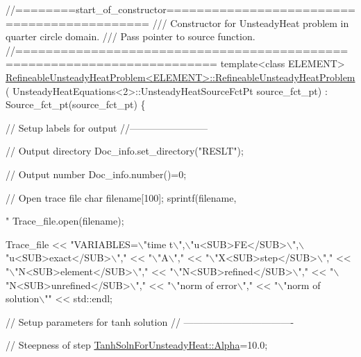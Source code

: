 \begin{DoxyCodeInclude}
\textcolor{comment}{//========start\_of\_constructor============================================}
\textcolor{comment}{/// Constructor for UnsteadyHeat problem in quarter circle domain.}
\textcolor{comment}{}\textcolor{comment}{/// Pass pointer to source function.}
\textcolor{comment}{}\textcolor{comment}{//========================================================================}
\textcolor{keyword}{template}<\textcolor{keyword}{class} ELEMENT>
\hyperlink{classRefineableUnsteadyHeatProblem_a894f3bd6c1c23c307a736de6898e4e98}{RefineableUnsteadyHeatProblem<ELEMENT>::RefineableUnsteadyHeatProblem}
      (
   UnsteadyHeatEquations<2>::UnsteadyHeatSourceFctPt source\_fct\_pt) : 
         Source\_fct\_pt(source\_fct\_pt)
\{ 


 \textcolor{comment}{// Setup labels for output}
 \textcolor{comment}{//------------------------}

 \textcolor{comment}{// Output directory}
 Doc\_info.set\_directory(\textcolor{stringliteral}{"RESLT"});
 
 \textcolor{comment}{// Output number}
 Doc\_info.number()=0; 
 
 \textcolor{comment}{// Open trace file}
 \textcolor{keywordtype}{char} filename[100];   
 sprintf(filename,\textcolor{stringliteral}{"%
 Trace\_file.open(filename);
 
 Trace\_file << \textcolor{stringliteral}{"VARIABLES=\(\backslash\)"time t\(\backslash\)",\(\backslash\)"u<SUB>FE</SUB>\(\backslash\)",\(\backslash\)"u<SUB>exact</SUB>\(\backslash\)","}
            << \textcolor{stringliteral}{"\(\backslash\)"A\(\backslash\)","}
            << \textcolor{stringliteral}{"\(\backslash\)"X<SUB>step</SUB>\(\backslash\)","}
            << \textcolor{stringliteral}{"\(\backslash\)"N<SUB>element</SUB>\(\backslash\)","}
            << \textcolor{stringliteral}{"\(\backslash\)"N<SUB>refined</SUB>\(\backslash\)","}
            << \textcolor{stringliteral}{"\(\backslash\)"N<SUB>unrefined</SUB>\(\backslash\)","}
            << \textcolor{stringliteral}{"\(\backslash\)"norm of error\(\backslash\)","}
            << \textcolor{stringliteral}{"\(\backslash\)"norm of solution\(\backslash\)""}
            << std::endl;


 \textcolor{comment}{// Setup parameters for tanh solution}
 \textcolor{comment}{// ----------------------------------}

 \textcolor{comment}{// Steepness of step}
 \hyperlink{namespaceTanhSolnForUnsteadyHeat_a4c75d9887d6f25405bbead696a94db63}{TanhSolnForUnsteadyHeat::Alpha}=10.0;

}
\end{DoxyCodeInclude}
